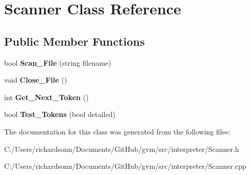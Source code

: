 \hypertarget{classScanner}{}\section{Scanner Class Reference}
\label{classScanner}
\subsection*{Public Member Functions}
\begin{DoxyCompactItemize}
\item 
\hypertarget{classScanner_adb4db4501de3524cb83afd0af51ce0a8}{}bool {\bfseries Scan\+\_\+\+File} (string filename)\label{classScanner_adb4db4501de3524cb83afd0af51ce0a8}

\item 
\hypertarget{classScanner_aaef6999cc795a5027d18022385d5da45}{}void {\bfseries Close\+\_\+\+File} ()\label{classScanner_aaef6999cc795a5027d18022385d5da45}

\item 
\hypertarget{classScanner_a09ebc084aea99d1a0a58975e84b6eabb}{}int {\bfseries Get\+\_\+\+Next\+\_\+\+Token} ()\label{classScanner_a09ebc084aea99d1a0a58975e84b6eabb}

\item 
\hypertarget{classScanner_ad0e93319cc105e1831799781f067a334}{}bool {\bfseries Test\+\_\+\+Tokens} (bool detailed)\label{classScanner_ad0e93319cc105e1831799781f067a334}

\end{DoxyCompactItemize}


The documentation for this class was generated from the following files\+:\begin{DoxyCompactItemize}
\item 
C\+:/\+Users/richardsonn/\+Documents/\+Git\+Hub/gvm/src/interpreter/Scanner.\+h\item 
C\+:/\+Users/richardsonn/\+Documents/\+Git\+Hub/gvm/src/interpreter/Scanner.\+cpp\end{DoxyCompactItemize}
